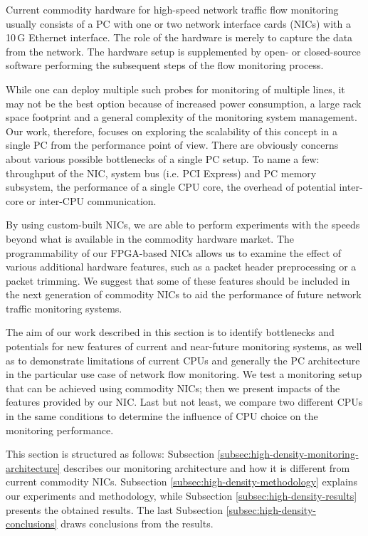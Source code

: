 Current commodity hardware for high-speed network traffic flow monitoring usually consists of a PC with one or two network interface cards (NICs) with a 10\,G Ethernet interface. The role of the hardware is merely to capture the data from the network. The hardware setup is supplemented by open- or closed-source software performing the subsequent steps of the flow monitoring process.

While one can deploy multiple such probes for monitoring of multiple lines, it may not be the best option because of increased power consumption, a large rack space footprint and a general complexity of the monitoring system management. Our work, therefore, focuses on exploring the scalability of this concept in a single PC from the performance point of view. There are obviously concerns about various possible bottlenecks of a single PC setup. To name a few: throughput of the NIC, system bus (i.e. PCI Express) and PC memory subsystem, the performance of a single CPU core, the overhead of potential inter-core or inter-CPU communication.

By using custom-built NICs, we are able to perform experiments with the speeds beyond what is available in the commodity hardware market. The programmability of our FPGA-based NICs allows us to examine the effect of various additional hardware features, such as a packet header preprocessing or a packet trimming. We suggest that some of these features should be included in the next generation of commodity NICs to aid the performance of future network traffic monitoring systems.

The aim of our work described in this section is to identify bottlenecks and potentials for new features of current and near-future monitoring systems, as well as to demonstrate limitations of current CPUs and generally the PC architecture in the particular use case of network flow monitoring. We test a monitoring setup that can be achieved using commodity NICs; then we present impacts of the features provided by our NIC. Last but not least, we compare two different CPUs in the same conditions to determine the influence of CPU choice on the monitoring performance.

This section is structured as follows: Subsection \ref{subsec:high-density-monitoring-architecture} describes our monitoring architecture and how it is different from current commodity NICs. Subsection \ref{subsec:high-density-methodology} explains our experiments and methodology, while Subsection \ref{subsec:high-density-results} presents the obtained results. The last Subsection \ref{subsec:high-density-conclusions} draws conclusions from the results.

